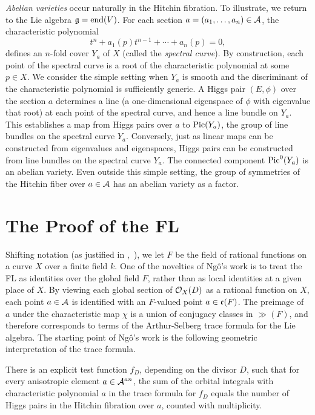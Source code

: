 {\it Abelian varieties} occur naturally in the Hitchin
fibration.  To illustrate, we return to the Lie
algebra $\gg=\op{end}(V)$.  For each section $a=(a_1,\ldots,a_n)\in
\AA$,  the characteristic
polynomial 
\begin{equation}\label{eqn:spectral}
t^n + a_1(p) t^{n-1} + \cdots+ a_n(p)=0,
\end{equation} 
defines an $n$-fold cover $Y_a$ of $X$ (called the {\it spectral
  curve}).  By construction, each point of the spectral curve is a
root of the characteristic polynomial at some $p\in X$.  We consider
the simple setting when $Y_a$ is smooth and the discriminant of the
characteristic polynomial is sufficiently generic.  A Higgs pair $(E,\phi)$ over
the section $a$ determines a line (a one-dimensional eigenspace of
$\phi$ with eigenvalue that root) at each point of the spectral curve,
and hence a line bundle on $Y_a$.  This establishes a map from Higgs
pairs over $a$ to $\op{Pic}(Y_a)$, the group of line bundles on the
spectral curve $Y_a$.  Conversely, just as linear maps can be
constructed from eigenvalues and eigenspaces, Higgs pairs can be
constructed from line bundles on the spectral curve $Y_a$.  The
connected component $\op{Pic}^0(Y_a)$ is an abelian variety.
Even outside this simple setting,  the group of symmetries of
the Hitchin fiber over $a\in\AA$ has an abelian
variety as a factor.


\section{The Proof of the FL}

Shifting notation (as justified in \cite{Wald:2006},~\cite{CHL:2010}),
we let $F$ be the field of rational functions on a curve $X$ over a
finite field $k$.  One of the novelties of Ng\^o's work is to treat
the FL as identities over the global field $F$, rather than as local
identities at a given place of $X$.
By viewing each global section of $\OO_X(D)$ as a
rational function on $X$, each point $a\in{\AA}$ is identified with an
$F$-valued point $a\in \cc(F)$.  The preimage of $a$ under the
characteristic map $\chi$ is a union of conjugacy classes in $\gg(F)$,
and therefore corresponds to terms of the Arthur-Selberg trace formula
for the Lie algebra.  The starting point of Ng\^o's work is the
following geometric interpretation of the trace formula.

\begin{thm}[Ng\^o] There is an explicit
  test function $f_D$, depending on the divisor $D$,
  such that for every anisotropic element $a\in\AA^{an}$, the
  sum of the orbital integrals with characteristic polynomial $a$  
  in the trace formula for $f_D$ 
  equals
  the number of Higgs pairs in the Hitchin fibration over $a$,
  counted with multiplicity.
\end{thm}

